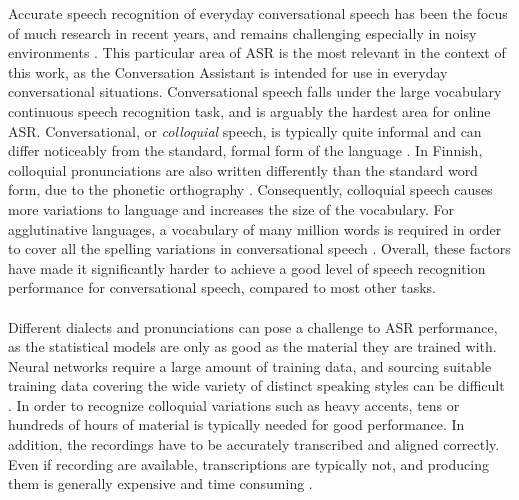 \documentclass[english, 12pt, a4paper, pdftex, elec, utf8]{aaltothesis}
\begin{document}
Accurate speech recognition of everyday conversational speech has been the focus of much research in recent years, and remains challenging especially in noisy environments \cite{keronen2014approaching, kallasjoki2016, xiong2016achieving, li2014overview, keronen2010comparison, pylkkonen2013towards}. This particular area of ASR is the most relevant in the context of this work, as the Conversation Assistant is intended for use in everyday conversational situations. Conversational speech falls under the large vocabulary continuous speech recognition task, and is arguably the hardest area for online ASR. Conversational, or \textit{colloquial} speech, is typically quite informal and can differ noticeably from the standard, formal form of the language \cite{enarvi2017automatic}. In Finnish, colloquial pronunciations are also written differently than the standard word form, due to the phonetic orthography \cite{enarvi2017automatic}. Consequently, colloquial speech causes more variations to language and increases the size of the vocabulary. For agglutinative languages, a vocabulary of many million words is required in order to cover all the spelling variations in conversational speech \cite{enarvi2017automatic}. Overall, these factors have made it significantly harder to achieve a good level of speech recognition performance for conversational speech, compared to most other tasks. \\\\
Different dialects and pronunciations can pose a challenge to ASR performance, as the statistical models are only as good as the material they are trained with. Neural networks require a large amount of training data, and sourcing suitable training data covering the wide variety of distinct speaking styles can be difficult \cite{mansikka17parliament}. In order to recognize colloquial variations such as heavy accents, tens or hundreds of hours of material is typically needed for good performance. In addition, the recordings have to be accurately transcribed and aligned correctly. Even if recording are available, transcriptions are typically not, and producing them is generally expensive and time consuming \cite{mansikka17parliament}.  \\\\
\end{document}
